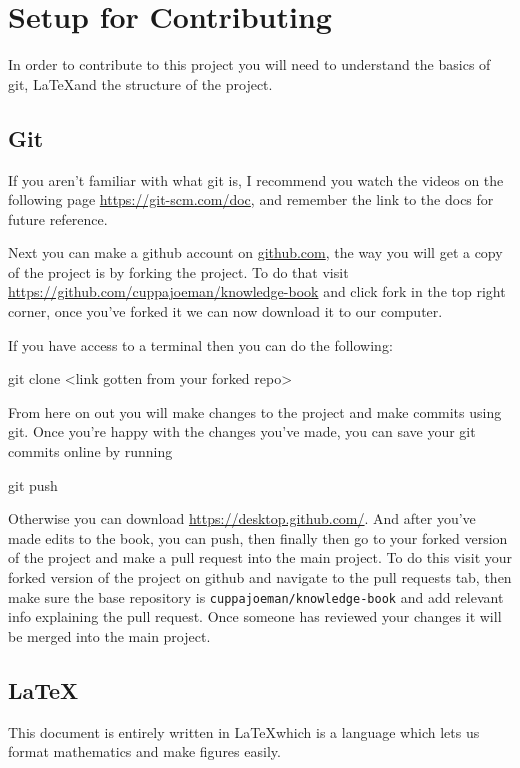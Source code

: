 \section*{Setup for Contributing}
In order to contribute to this project you will need to understand the basics of
git, \LaTeX and the structure of the project.

\subsection*{Git}
If you aren't familiar with what git is, I recommend you watch the videos on the
following page \url{https://git-scm.com/doc}, and remember the link to the docs
for future reference. 

Next you can make a github account on \url{github.com}, the way you will get a
copy of the project is by forking the project. To do that visit
\url{https://github.com/cuppajoeman/knowledge-book} and click fork in the top
right corner, once you've forked it we can now download it to our computer.

If you have access to a terminal then you can do the following:

\begin{term}
git clone <link gotten from your forked repo>
\end{term}

From here on out you will make changes to the project and make commits using
git. Once you're happy with the changes you've made, you can save your git
commits online by running

\begin{term}
git push
\end{term}

Otherwise you can download \url{https://desktop.github.com/}. And after you've
made edits to the book, you can push, then finally then go to your forked
version of the project and make a pull request into the main project. To do this
visit your forked version of the project on github and navigate to the pull
requests tab, then make sure the base repository is
\texttt{cuppajoeman/knowledge-book} and add relevant info explaining the pull
request. Once someone has reviewed your changes it will be merged into the main
project.

\subsection*{\LaTeX}

This document is entirely written in \LaTeX which is a language which lets us
format mathematics and make figures easily.

